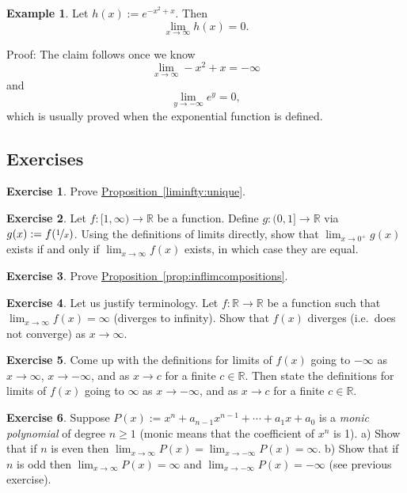 \documentclass[12pt]{book}
\newcommand{\R}{{\mathbb{R}}}
\newcommand{\myindex}[1]{#1\index{#1}}
\theoremstyle{plain}
\theoremstyle{remark}
\theoremstyle{definition}
\theoremstyle{exercise}
\newtheorem{exercise}{Exercise}[section]
\theoremstyle{example}
\newtheorem{example}[thm]{Example}
\newcommand{\propref}[1]{\hyperref[#1]{Proposition~\ref*{#1}}}
\begin{document}
\begin{example}
Let $h(x) := e^{-x^2+x}$.  Then
\begin{equation*}
\lim_{x\to \infty} h(x) = 0 .
\end{equation*}

Proof:
The claim follows once we know
\begin{equation*}
\lim_{x\to \infty} -x^2+x = -\infty
\end{equation*}
and
\begin{equation*}
\lim_{y\to -\infty} e^y = 0 ,
\end{equation*}
which is usually proved when the exponential function is defined.
\end{example}

\subsection{Exercises}

\begin{exercise}
Prove \propref{liminfty:unique}.
\end{exercise}

\begin{exercise}
Let $f \colon [1,\infty) \to \R$ be a function.  Define
$g \colon (0,1] \to \R$ via $g(x) := f(\nicefrac{1}{x})$.
Using the definitions of limits directly,
show that $\lim_{x\to 0^+} g(x)$
exists if and only if $\lim_{x\to \infty} f(x)$ exists, in which
case they are equal.
\end{exercise}

\begin{exercise}
Prove \propref{prop:inflimcompositions}.
\end{exercise}

\begin{exercise}
Let us justify terminology.
Let $f \colon \R \to \R$ be a function such that
$\lim_{x \to \infty} f(x) = \infty$ (diverges to infinity).
Show that $f(x)$ diverges (i.e.\ does not converge) as $x \to \infty$.
\end{exercise}

\begin{exercise}
Come up with the definitions for limits of $f(x)$ going to $-\infty$ as $x \to
\infty$, $x \to -\infty$, and as $x \to c$ for a finite $c \in \R$.
Then state the definitions for limits of $f(x)$ going to $\infty$ 
as $x \to -\infty$, and as $x \to c$ for a finite $c \in \R$.
\end{exercise}

\begin{exercise}
Suppose $P(x) := x^n + a_{n-1} x^{n-1} + \cdots + a_1 x + a_0$ is a \emph{\myindex{monic polynomial}}
of degree $n \geq 1$ (monic means that the coefficient of $x^n$ is 1). a)
Show that if $n$ is even then $\lim_{x\to\infty} P(x) = 
\lim_{x\to-\infty} P(x) = \infty$.  b)
Show that if $n$ is odd then
$\lim_{x\to\infty} P(x) = \infty$ and
$\lim_{x\to-\infty} P(x) = -\infty$ (see previous exercise).
\end{exercise}
\end{document}
